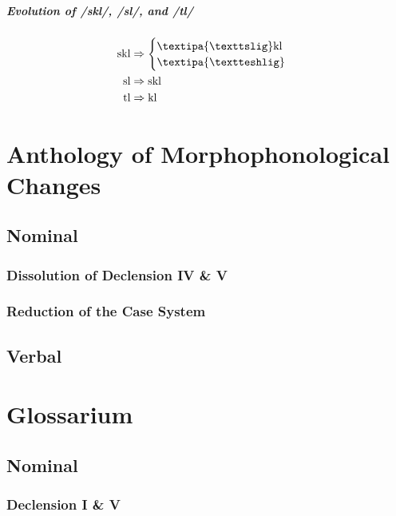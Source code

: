 \documentclass{report}
\begin{document}
\paragraph{Evolution of /skl/, /sl/, and /tl/}

\begin{align}
  \text{skl} & \Rightarrow \begin{cases}
                             \text{\textipa{\texttslig}kl} \\
                             \text{\textipa{\textteshlig}}
                           \end{cases}\\
  \text{sl} & \Rightarrow \text{skl} \\
  \text{tl} & \Rightarrow \text{kl}
\end{align}

\chapter{Anthology of Morphophonological Changes}

\section{Nominal}

\subsection{Dissolution of Declension IV \& V}

\subsection{Reduction of the Case System}

\section{Verbal}

\chapter{Glossarium}

\section{Nominal}

\subsection{Declension I \& V}
\end{document}
